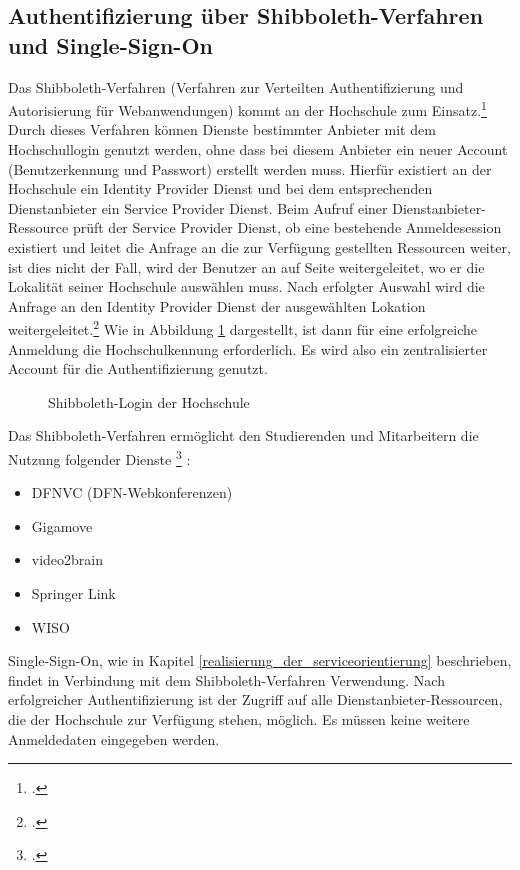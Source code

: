 \subsection{Authentifizierung über Shibboleth-Verfahren und Single-Sign-On}
\label{shibboleth_sso} 

Das Shibboleth-Verfahren (Verfahren zur Verteilten Authentifizierung und Autorisierung für 
Webanwendungen) kommt an der Hochschule zum Einsatz.\footcite[Vgl.][]{hsel_shibboleth_auth_2015}  
Durch dieses Verfahren können Dienste bestimmter Anbieter mit dem Hochschullogin genutzt werden, 
ohne dass bei diesem Anbieter ein neuer Account (Benutzerkennung und Passwort) erstellt werden 
muss. Hierfür existiert an der Hochschule ein Identity Provider Dienst und bei dem entsprechenden 
Dienstanbieter ein Service Provider Dienst.  Beim Aufruf einer Dienstanbieter-Ressource prüft der 
Service Provider Dienst, ob eine bestehende Anmeldesession existiert und leitet die Anfrage an die zur 
Verfügung gestellten Ressourcen weiter, ist dies nicht der Fall, wird der Benutzer an auf Seite 
weitergeleitet, wo er die Lokalität seiner Hochschule auswählen muss. Nach erfolgter Auswahl wird die 
Anfrage an den Identity Provider Dienst der ausgewählten Lokation 
weitergeleitet.\footcite[Vgl.][]{kit_shibboleth_2012} Wie in Abbildung \ref{fig_shibboleth_hs} 
dargestellt, ist dann für eine erfolgreiche Anmeldung die Hochschulkennung erforderlich. Es wird also 
ein zentralisierter Account für die Authentifizierung genutzt.  

\begin{figure}[h]
	\centering
	\caption{Shibboleth-Login der Hochschule\protect\footnotemark}
	\label{fig_shibboleth_hs}
\end{figure}
\clearpage
Das Shibboleth-Verfahren ermöglicht den Studierenden und Mitarbeitern die Nutzung folgender Dienste \footcite{hsel_shibboleth_vpn_2015} :

\begin{itemize}
	\item DFNVC (DFN-Webkonferenzen)
	\item Gigamove
	\item video2brain
	\item Springer Link	
	\item WISO	
\end{itemize}

Single-Sign-On, wie in Kapitel \ref{realisierung_der_serviceorientierung} beschrieben, findet in Verbindung mit dem Shibboleth-Verfahren Verwendung. Nach erfolgreicher Authentifizierung ist der Zugriff auf alle Dienstanbieter-Ressourcen, die der Hochschule zur Verfügung stehen, möglich. Es müssen keine weitere Anmeldedaten eingegeben werden.

